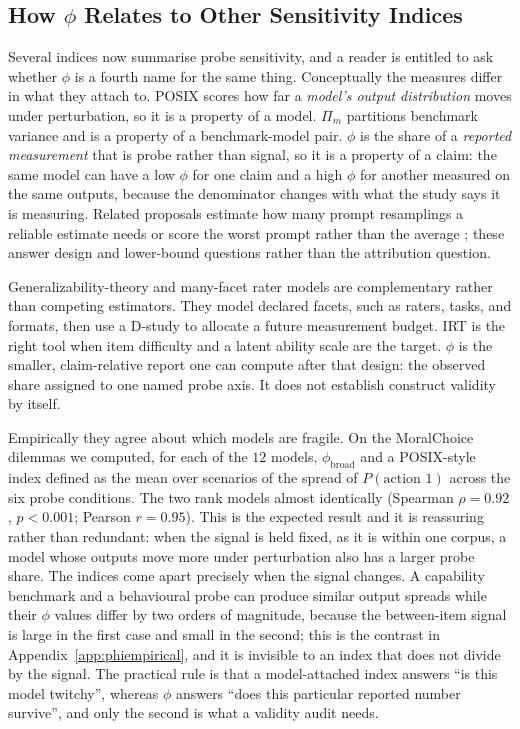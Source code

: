 \documentclass[11pt]{article}
\begin{document}
\subsection{How $\phi$ Relates to Other Sensitivity Indices}
\label{app:phivsposix}

Several indices now summarise probe sensitivity, and a reader is entitled to ask
whether $\phi$ is a fourth name for the same thing. Conceptually the measures
differ in what they attach to. POSIX \citep{chatterjee2024posix} scores how far a
\emph{model's output distribution} moves under perturbation, so it is a property
of a model. $\Pi_m$ \citep{romanou2026brittlebench} partitions benchmark variance
and is a property of a benchmark-model pair. $\phi$ is the share of a
\emph{reported measurement} that is probe rather than signal, so it is a property
of a claim: the same model can have a low $\phi$ for one claim and a high $\phi$
for another measured on the same outputs, because the denominator changes with
what the study says it is measuring. Related proposals estimate how many prompt
resamplings a reliable estimate needs \citep{lior2025reliableeval} or score the
worst prompt rather than the average \citep{cao2024worst}; these answer design
and lower-bound questions rather than the attribution question.

Generalizability-theory and many-facet rater models are complementary rather
than competing estimators. They model declared facets, such as raters, tasks,
and formats, then use a D-study to allocate a future measurement budget. IRT is
the right tool when item difficulty and a latent ability scale are the target.
$\phi$ is the smaller, claim-relative report one can compute after that design:
the observed share assigned to one named probe axis. It does not establish
construct validity by itself.

Empirically they agree about which models are fragile. On the MoralChoice
dilemmas we computed, for each of the $12$ models, $\phi_{\text{broad}}$ and a
POSIX-style index defined as the mean over scenarios of the spread of
$P(\text{action 1})$ across the six probe conditions. The two rank models almost
identically (Spearman $\rho=0.92$, $p<0.001$; Pearson $r=0.95$). This is the
expected result and it is reassuring rather than redundant: when the signal is
held fixed, as it is within one corpus, a model whose outputs move more under
perturbation also has a larger probe share. The indices come apart precisely when
the signal changes. A capability benchmark and a behavioural probe can produce
similar output spreads while their $\phi$ values differ by two orders of
magnitude, because the between-item signal is large in the first case and small
in the second; this is the contrast in Appendix~\ref{app:phiempirical}, and it is
invisible to an index that does not divide by the signal. The practical rule is
that a model-attached index answers ``is this model twitchy'', whereas $\phi$
answers ``does this particular reported number survive'', and only the second is
what a validity audit needs.
\end{document}
